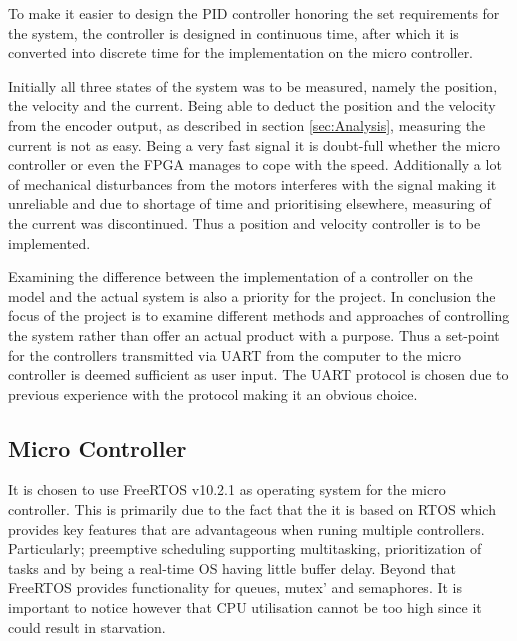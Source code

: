 \documentclass[../../main.tex]{subfiles}
\begin{document}
To make it easier to design the PID controller honoring the set requirements for the system, the controller is designed in continuous time, after which it is converted into discrete time for the implementation on the micro controller. 

Initially all three states of the system was to be measured, namely the position, the velocity and the current. Being able to deduct the position and the velocity from the encoder output, as described in section \ref{sec:Analysis}, measuring the current is not as easy. Being a very fast signal it is doubt-full whether the micro controller or even the FPGA manages to cope with the speed. Additionally a lot of mechanical disturbances from the motors interferes with the signal making it unreliable and due to shortage of time and prioritising elsewhere, measuring of the current was discontinued. Thus a position and velocity controller is to be implemented.

Examining the difference between the implementation of a controller on the model and the actual system is also a priority for the project. In conclusion the focus of the project is to examine different methods and approaches of controlling the system rather than offer an actual product with a purpose. Thus a set-point for the controllers transmitted via UART from the computer to the micro controller is deemed sufficient as user input. The UART protocol is chosen due to previous experience with the protocol making it an obvious choice. 



\subsection*{Micro Controller}
It is chosen to use FreeRTOS v10.2.1 as operating system for the micro controller. This is primarily due to the fact that the it is based on RTOS which provides key features that are advantageous when runing multiple controllers. Particularly; preemptive scheduling supporting multitasking, prioritization of tasks and by being a real-time OS having little buffer delay. Beyond that FreeRTOS provides functionality for queues, mutex' and semaphores. It is important to notice however that CPU utilisation cannot be too high since it could result in starvation.
\end{document}
